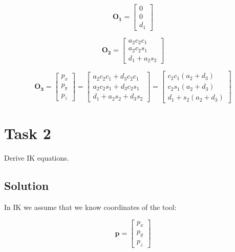 \documentclass[12pt, a4paper]{report}
\begin{document}
\begin{equation}
        \bm{O_1} =
        \begin{bmatrix}
                0\\
                0\\
                d_1
        \end{bmatrix}
\end{equation}

\begin{equation}
        \bm{O_2} =
        \begin{bmatrix}
                a_2c_2c_1\\
               a_2c_2s_1\\
                d_1+a_2s_2
        \end{bmatrix}
\end{equation}

\begin{equation}
        \bm{O_3} =
                \begin{bmatrix}
                p_x\\
               p_y\\
                p_z
        \end{bmatrix}
        =
        \begin{bmatrix}
                a_2c_2c_1+d_3c_2c_1\\
               a_2c_2s_1+d_3c_2s_1\\
                d_1+a_2s_2+d_3s_2
        \end{bmatrix} 
        = 
        \begin{bmatrix}
                c_2c_1(a_2+d_3)\\
               c_2s_1(a_2+d_3)\\
                d_1+s_2(a_2+d_3)
        \end{bmatrix}
\end{equation}

\section*{Task 2} \label{sec:Task 2}
 Derive IK equations.

{\centering
\subsection*{Solution}
}

In IK we assume that we know coordinates of the tool:

\begin{equation}
        \bm{p} =
        \begin{bmatrix}
                p_x\\
               p_y\\
                p_z
        \end{bmatrix}
\end{equation}
\end{document}
